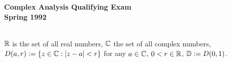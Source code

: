 \documentclass{article}
\begin{document}






\begin{center}\begin{LARGE}
{\bf Complex Analysis Qualifying Exam}\\ 
{\bf Spring 1992}\\ \end{LARGE}
\end{center}
\vspace{0.1in}
\noindent\hrulefill\\
$\Bbb R$ is the set of all real numbers, $\Bbb C$ the set of all complex
numbers, $D(a,r) := \{z \in \Bbb C : |z-a| < r\}$ for any
$a \in \Bbb C$, $0 < r \in \Bbb R$, $\Bbb D := D(0,1)$.
\end{document}
